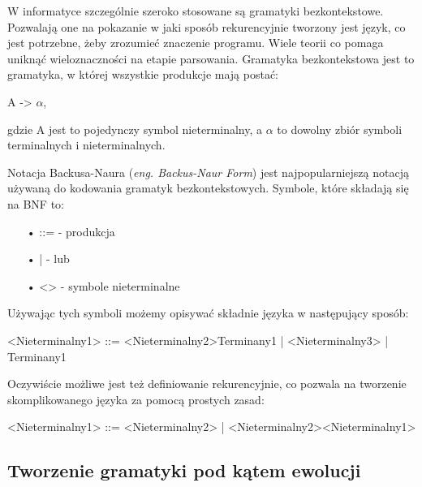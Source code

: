W informatyce szczególnie szeroko stosowane są gramatyki bezkontekstowe. Pozwalają one na pokazanie w jaki sposób rekurencyjnie tworzony jest język, co jest potrzebne, żeby zrozumieć znaczenie programu. Wiele teorii co pomaga uniknąć wieloznaczności na etapie parsowania. 
Gramatyka bezkontekstowa jest to gramatyka, w której wszystkie produkcje mają postać:
\begin{center}
	A -> {$\alpha$},
\end{center}
gdzie A jest to pojedynczy symbol nieterminalny, a $\alpha$ to dowolny zbiór symboli terminalnych i nieterminalnych.
	
Notacja Backusa-Naura (\textit{eng. Backus-Naur Form})\cite{Backus1959TheSA}\cite{Naur}\cite{Knuth1964} jest najpopularniejszą notacją używaną do kodowania gramatyk bezkontekstowych. Symbole, które składają się na BNF to:

\begin{itemize}
  \item[•] ::= - produkcja
  \item[•] |   - lub
  \item[•] <>  - symbole nieterminalne
\end{itemize}

Używając tych symboli możemy opisywać składnie języka w następujący sposób:
\begin{center}
<Nieterminalny1> ::= <Nieterminalny2>Terminany1 | <Nieterminalny3> | Terminany1
\end{center}
Oczywiście możliwe jest też definiowanie rekurencyjnie, co pozwala na tworzenie skomplikowanego języka za pomocą prostych zasad: 
\begin{center}
<Nieterminalny1> ::= <Nieterminalny2> | <Nieterminalny2><Nieterminalny1>
\end{center}

\subsection{Tworzenie gramatyki pod kątem ewolucji}

